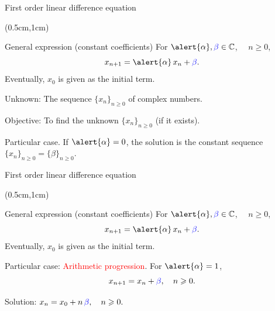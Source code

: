 \documentclass[10pt,t]{beamer}
\begin{document}
\begin{frame}{First order linear difference equation}

	\transwipe
	
	\begin{textblock*}{12cm}(0.5cm,1cm)
	
	\begin{block}{General expression (constant coefficients)}
	For $\alert{\alpha}, \textcolor{blue}{\beta} \in \mathbb{C}$, $\quad n\geqslant 0$,
	\begin{equation*}
	x_{n+1} = \alert{\alpha} \, x_n + \textcolor{blue}{\beta}.
	\end{equation*}
	Eventually, $x_0$ is given as the initial term.
	\end{block}
	
	\end{textblock*}
	
	\pause
	
	\vspace{3cm}
	
	\alert{Unknown}: The sequence $\{x_n\}_{n\geqslant0}$ of complex numbers.
	
	\vspace{1cm}
	
	\alert{Objective}: To find the unknown $\{x_n\}_{n\geqslant0}$ (if it exists).
	
	
	\vspace{1cm}
	
	\alert{Particular case}. If $\alert{\alpha} =0$, the solution is the constant sequence $\{x_n\}_{n\geqslant0} = \{\beta\}_{n\geqslant0}.$
	
	
	\end{frame}
	
	
	\begin{frame}{First order linear difference equation}
	
	\transwipe
	
	\begin{textblock*}{12cm}(0.5cm,1cm)
	
	\begin{block}{General expression (constant coefficients)}
	For $\alert{\alpha}, \textcolor{blue}{\beta} \in \mathbb{C}$, $\quad n\geqslant 0$,
	\begin{equation*}
	x_{n+1} = \alert{\alpha} \, x_n + \textcolor{blue}{\beta}.
	\end{equation*}
	Eventually, $x_0$ is given as the initial term.
	\end{block}
	
	\end{textblock*}
	
	\vspace{3cm}
	
	Particular case:  \textcolor{red}{Arithmetic progression}.  For $\alert{\alpha} = 1$,
	$$
	x_{n+1} = x_n + \textcolor{blue}{\beta}, \quad n\geqslant 0.
	$$
	
	\vspace{1cm}
	
	Solution: \quad $x_{n} = x_0 + n\,\textcolor{blue}{\beta}, \quad n\geqslant 0.$
	 
	\end{frame}
	
\end{document}
